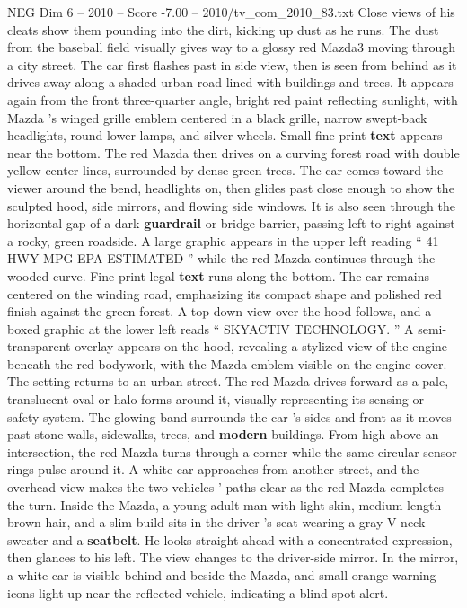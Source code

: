 \begin{textsample}{NEG Dim 6 – 2010 – Score -7.00 – 2010/tv\_com\_2010\_83.txt}
Close views of his cleats show them pounding into the dirt, kicking up dust as he runs.
The dust from the baseball field visually gives way to a glossy red Mazda3 moving through a city street.
The car first flashes past in side view, then is seen from behind as it drives away along a shaded urban road lined with buildings and trees.
It appears again from the front three-quarter angle, bright red paint reflecting sunlight, with Mazda ’s winged grille emblem centered in a black grille, narrow swept-back headlights, round lower lamps, and silver wheels.
Small fine-print \textbf{text} appears near the bottom.
The red Mazda then drives on a curving forest road with double yellow center lines, surrounded by dense green trees.
The car comes toward the viewer around the bend, headlights on, then glides past close enough to show the sculpted hood, side mirrors, and flowing side windows.
It is also seen through the horizontal gap of a dark \textbf{guardrail} or bridge barrier, passing left to right against a rocky, green roadside.
A large graphic appears in the upper left reading “ 41 HWY MPG EPA-ESTIMATED ” while the red Mazda continues through the wooded curve.
Fine-print legal \textbf{text} runs along the bottom.
The car remains centered on the winding road, emphasizing its compact shape and polished red finish against the green forest.
A top-down view over the hood follows, and a boxed graphic at the lower left reads “ SKYACTIV TECHNOLOGY. ” A semi-transparent overlay appears on the hood, revealing a stylized view of the engine beneath the red bodywork, with the Mazda emblem visible on the engine cover.
The setting returns to an urban street.
The red Mazda drives forward as a pale, translucent oval or halo forms around it, visually representing its sensing or safety system.
The glowing band surrounds the car ’s sides and front as it moves past stone walls, sidewalks, trees, and \textbf{modern} buildings.
From high above an intersection, the red Mazda turns through a corner while the same circular sensor rings pulse around it.
A white car approaches from another street, and the overhead view makes the two vehicles ’ paths clear as the red Mazda completes the turn.
Inside the Mazda, a young adult man with light skin, medium-length brown hair, and a slim build sits in the driver ’s seat wearing a gray V-neck sweater and a \textbf{seatbelt}.
He looks straight ahead with a concentrated expression, then glances to his left.
The view changes to the driver-side mirror.
In the mirror, a white car is visible behind and beside the Mazda, and small orange warning icons light up near the reflected vehicle, indicating a blind-spot alert.

\end{textsample}
